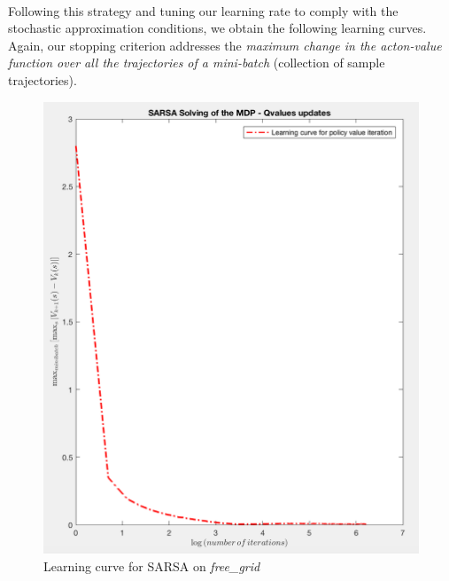\documentclass[a4paper]{report}
\begin{document}
{{{				\paragraph{} Following this strategy and tuning our learning rate to comply with the stochastic approximation conditions, we obtain the following learning curves. Again, our stopping criterion addresses the \emph{maximum change in the acton-value function over all the trajectories of a mini-batch} (collection of sample trajectories). 
				\begin{figure}[ht!]
					\begin{minipage}{0.4\linewidth}
						\includegraphics[width=0.9\linewidth]{sarsa_learning_curve_free_grid}
						\caption{Learning curve for SARSA on \emph{free\_grid}}
					\end{minipage}
					\hfill
					\begin{minipage}{0.4\linewidth}

\end{minipage}
\end{figure}}}}
\end{document}
